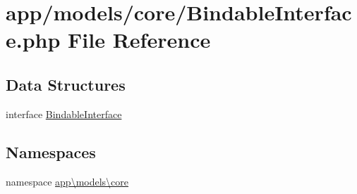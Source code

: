 \hypertarget{_bindable_interface_8php}{\section{app/models/core/\-Bindable\-Interface.php File Reference}
\label{_bindable_interface_8php}
}
\subsection*{Data Structures}
\begin{DoxyCompactItemize}
\item 
interface \hyperlink{interfaceapp_1_1models_1_1core_1_1_bindable_interface}{Bindable\-Interface}
\end{DoxyCompactItemize}
\subsection*{Namespaces}
\begin{DoxyCompactItemize}
\item 
namespace \hyperlink{namespaceapp_1_1models_1_1core}{app\textbackslash{}models\textbackslash{}core}
\end{DoxyCompactItemize}
